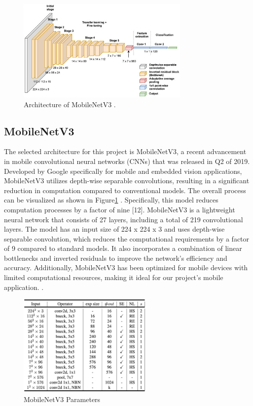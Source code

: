 \documentclass[conference]{IEEEtran}
\begin{document}
\begin{figure}[h]
\centerline{\includegraphics[height=5cm, width = 1\linewidth]{Images/mobile_net3.png}}
\caption{Architecture of MobileNetV3 \cite{m}.}
\label{VGG16}
\end{figure}


\subsection{MobileNetV3}
The selected architecture for this project is MobileNetV3, a recent advancement in mobile convolutional neural networks (CNNs) that was released in Q2 of 2019. Developed by Google specifically for mobile and embedded vision applications, MobileNetV3 utilizes depth-wise separable convolutions, resulting in a significant reduction in computation compared to conventional models. The overall process can be visualized as shown in Figure\ref{VGG16} . Specifically, this model reduces computation processes by a factor of nine [12]. MobileNetV3 is a lightweight neural network that consists of 27 layers, including a total of 219 convolutional layers. The model has an input size of 224 x 224 x 3 and uses depth-wise separable convolution, which reduces the computational requirements by a factor of 9 compared to standard models. It also incorporates a combination of linear bottlenecks and inverted residuals to improve the network's efficiency and accuracy. Additionally, MobileNetV3 has been optimized for mobile devices with limited computational resources, making it ideal for our project's mobile application. \cite{Howard-Zhu}.

\begin{figure}[h]
\centerline{\includegraphics[height=5cm, width = 1\linewidth]{Images/Screen Shot 2021-05-03 at 3.35.10 PM.pdf}}
\caption{MobileNetV3 Parameters \cite{Howard-Sandler}}
\label{MobV3 Arch}
\end{figure}
\end{document}
